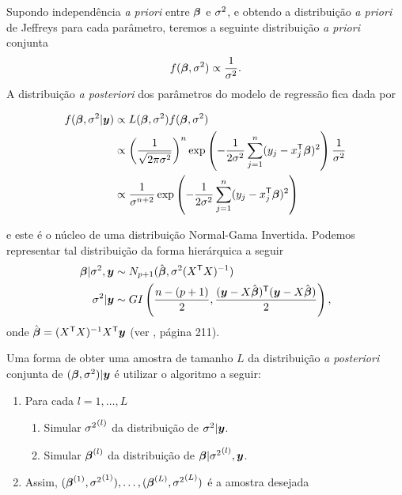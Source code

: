 Supondo independência \textit{a priori} entre ${\boldsymbol{\beta}}$ e $\sigma^2$, e obtendo a distribuição \textit{a priori} de Jeffreys para cada parâmetro, teremos a seguinte distribuição \textit{a priori} conjunta
\begin{equation}\label{eq:Normal_prior}
f({\boldsymbol{\beta}},\sigma^2)\propto \frac{1}{\sigma^2}.
\end{equation}
A distribuição \textit{a posteriori} dos parâmetros do modelo de regressão fica dada por

\begin{align}
f({\boldsymbol{\beta}},\sigma^2|{\boldsymbol{y}})& \propto L({\boldsymbol{\beta}},\sigma^2)f({\boldsymbol{\beta}},\sigma^2) \notag \\
{}& \propto \left(\frac{1}{\sqrt{2\pi\sigma^2}}\right)^n\exp\left(-\frac{1}{2\sigma^2}\sum_{j=1}^n (y_j-x_j^{\mathsf{T}}{\boldsymbol{\beta}})^2\right) \frac{1}{\sigma^2} \\
{}& \propto \frac{1}{\sigma^{n+2}}\exp\left(-\frac{1}{2\sigma^2}\sum_{j=1}^n (y_j-x_j^{\mathsf{T}}{\boldsymbol{\beta}})^2\right) \notag 
\end{align}

e este é o núcleo de uma distribuição Normal-Gama Invertida. Podemos representar tal distribuição da forma hierárquica a seguir
\begin{equation}
\begin{split}
{\boldsymbol{\beta}} | \sigma^2, {\boldsymbol{y}} & \sim N_{p+1}({\hat{\boldsymbol{\beta}}},\sigma^2(X^{\mathsf{T}} X)^{-1})\\
\sigma^2| {\boldsymbol{y}} & \sim GI\left(\frac{n-(p+1)}{2},\frac{({\boldsymbol{y}}-X{\hat{\boldsymbol{\beta}}})^{\mathsf{T}}({\boldsymbol{y}}-X{\hat{\boldsymbol{\beta}}})}{2}\right),\\
\end{split}
\end{equation}
onde ${\hat{\boldsymbol{\beta}}} = (X^{\mathsf{T}} X)^{-1}X^{\mathsf{T}}{\boldsymbol{y}}$ (ver \citet{Paulino2003}, página 211).

Uma forma de obter uma amostra de tamanho $L$ da distribuição \textit{a posteriori} conjunta de $({\boldsymbol{\beta}},\sigma^2)|{\boldsymbol{y}}$ é utilizar o algoritmo a seguir: 
\begin{enumerate}
\item[] Para cada $l=1,\ldots,L$
\begin{enumerate}
\item Simular ${\sigma^2}^{(l)}$ da distribuição de $\sigma^2|{\boldsymbol{y}}$.
\item Simular ${\boldsymbol{\beta}}^{(l)}$ da distribuição de ${\boldsymbol{\beta}}|{\sigma^2}^{(l)},{\boldsymbol{y}}$.
\end{enumerate}
\item[] Assim, $({\boldsymbol{\beta}}^{(1)},{\sigma^2}^{(1)}),\ldots,({\boldsymbol{\beta}}^{(L)},{\sigma^2}^{(L)})$ é a amostra desejada
\end{enumerate}

